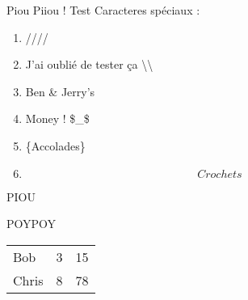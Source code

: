 
Piou Piiou !
Test Caracteres spéciaux :
\begin{enumerate}
\item \backslasho/\backslasho/\backslasho/\backslasho/
\item J'ai oublié de tester ça \backslash\backslash
\item Ben \& Jerry's
\item Money ! \$_\$
$$ $$ $$$$$$$$$$$$
\item \{Accolades\}
\item \[Crochets\]
\end{enumerate}

\begin{itemize}
\itemPIOU PIOU
\begin{enumerate}
\end{enumerate}
\itemPILPIL
\end{itemize}
POYPOY
\begin{enumerate}
\end{enumerate}
\begin{tabular}{llc}
Bob & 3 & 15 \\
Chris & 8 & 78 \\
\end{tabular}

